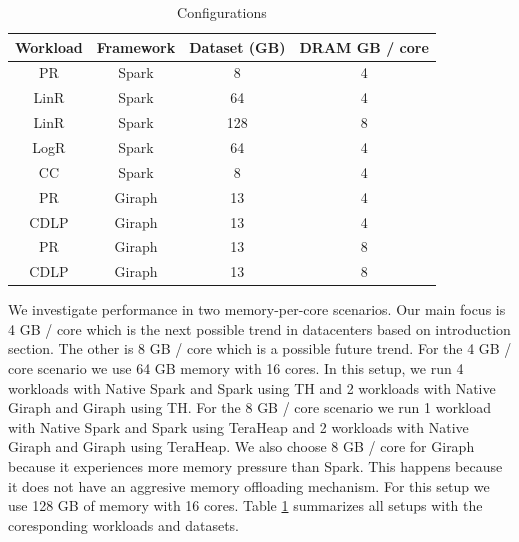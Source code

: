 \begin{table}[thbp]
  \centering
  \caption{Configurations}
  \label{tab:setups}
  \begin{tabular}{|c|c|c|c|}
    \hline
	  \textbf{Workload} & \textbf{Framework} & \textbf{Dataset (GB)} & \textbf{DRAM GB / core} \\
    \hline
	  PR & Spark & 8 & 4 \\
	  LinR & Spark & 64 & 4 \\
	  LinR & Spark & 128 & 8 \\
    	LogR & Spark & 64 & 4 \\
	  CC & Spark & 8 & 4 \\
	  PR & Giraph & 13 & 4 \\
	  CDLP & Giraph & 13 & 4 \\
	  PR & Giraph & 13 & 8 \\
	  CDLP & Giraph & 13 & 8 \\
    \hline
  \end{tabular}
\end{table}


We investigate performance in two memory-per-core scenarios. Our main focus is 4 GB / core 
which is the next possible trend in datacenters based on introduction section. The other
is 8 GB / core which is a possible future trend. For the 4 GB / core scenario we use 64 GB memory with 16 cores.
In this setup, we run 4 workloads with Native Spark and Spark using TH and 2 workloads with Native Giraph and Giraph using TH. For the 8 GB / core scenario we run 1 workload with Native Spark and Spark using TeraHeap and 2 workloads with Native Giraph and Giraph using TeraHeap. We also choose 8 GB / core for Giraph because it experiences more memory pressure than Spark. This happens because it does not have
an aggresive memory offloading mechanism. For this setup we use 128 GB of memory with 16 cores. 
Table \ref{tab:setups} summarizes all setups with the coresponding workloads and datasets.

